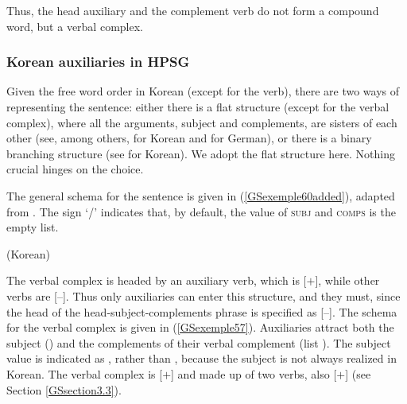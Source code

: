 {Thus, the head auxiliary and the complement verb do not form a compound word, but a verbal
complex.

\subsubsection{Korean auxiliaries in HPSG}\label{GSsection4.2.3}

Given the free word order in Korean (except for the verb), there are two ways of representing the sentence: either there is a flat structure (except for the verbal complex), where all the arguments, subject and complements, are sisters of each other (see, among others, \citealt{Chung98a-u} for Korean and \citealt{HN98a} for German), or there is a binary branching structure (see \citealt{Kim2016a-u} for Korean). We adopt the flat structure here. Nothing crucial hinges on the choice.

The general schema for the sentence is given in (\ref{GSexemple60added}), adapted from \cite[178]{Chung98a-u}. The sign `/' indicates that, by default, the value of \textsc{subj} and \textsc{comps} is the empty list.


\ea
\label{GSexemple60added}
 (Korean) \impl \\
\z

The verbal complex is headed by an auxiliary verb, which is [\aux $+$], while other verbs are [\aux $–$].  Thus only auxiliaries can enter this structure, and they must, since the head of the head-subject-complements phrase is specified as [\aux $–$]. The schema for the verbal complex is given in (\ref{GSexemple57}). Auxiliaries attract both the subject () and the complements of their verbal complement (list ). The subject value is indicated as , rather than \la{}\ra, because the subject is not always realized in Korean. The verbal complex is [\light $+$] and made up of two verbs, also [\light $+$] (see Section \ref{GSsection3.3}). 


}
